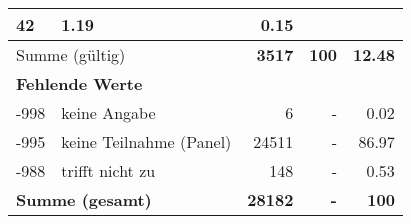 \begin{longtable}{lXrrr}
       \num{42} &
       \num[round-mode=places,round-precision=2]{1.19} &
         \num[round-mode=places,round-precision=2]{0.15} \\
     \midrule
     \multicolumn{2}{l}{Summe (gültig)} &
       \textbf{\num{3517}} &
     \textbf{\num{100}} &
       \textbf{\num[round-mode=places,round-precision=2]{12.48}} \\
     \multicolumn{5}{l}{\textbf{Fehlende Werte}}\\
       -998 &
       keine Angabe &
         \num{6} &
        - &
         \num[round-mode=places,round-precision=2]{0.02} \\
       -995 &
       keine Teilnahme (Panel) &
         \num{24511} &
        - &
         \num[round-mode=places,round-precision=2]{86.97} \\
       -988 &
       trifft nicht zu &
         \num{148} &
        - &
         \num[round-mode=places,round-precision=2]{0.53} \\
     \midrule
     \multicolumn{2}{l}{\textbf{Summe (gesamt)}} &
          \textbf{\num{28182}} &
        \textbf{-} &
        \textbf{\num{100}} \\
     \bottomrule
     \end{longtable}
     
